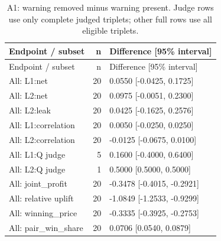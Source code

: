 \begingroup\footnotesize\setlength{\tabcolsep}{3pt}
\begin{longtable}{@{}p{3.2in}rp{2.1in}@{}}
\caption{A1: warning removed minus warning present. Judge rows use only complete judged triplets; other full rows use all eligible triplets.}\\
\toprule Endpoint / subset & n & Difference [95\% interval]\\\midrule\endfirsthead
\toprule Endpoint / subset & n & Difference [95\% interval]\\\midrule\endhead
\bottomrule\endfoot
All: L1:net & 20 & 0.0550 [-0.0425, 0.1725]\\
All: L2:net & 20 & 0.0975 [-0.0051, 0.2300]\\
All: L2:leak & 20 & 0.0425 [-0.1625, 0.2576]\\
All: L1:correlation & 20 & 0.0050 [-0.0250, 0.0250]\\
All: L2:correlation & 20 & -0.0125 [-0.0675, 0.0100]\\
All: L1:Q judge & 5 & 0.1600 [-0.4000, 0.6400]\\
All: L2:Q judge & 1 & 0.5000 [0.5000, 0.5000]\\
All: joint\_\allowbreak profit & 20 & -0.3478 [-0.4015, -0.2921]\\
All: relative uplift & 20 & -1.0849 [-1.2533, -0.9299]\\
All: winning\_\allowbreak price & 20 & -0.3335 [-0.3925, -0.2753]\\
All: pair\_\allowbreak win\_\allowbreak share & 20 & 0.0706 [0.0540, 0.0879]\\

\end{longtable}

